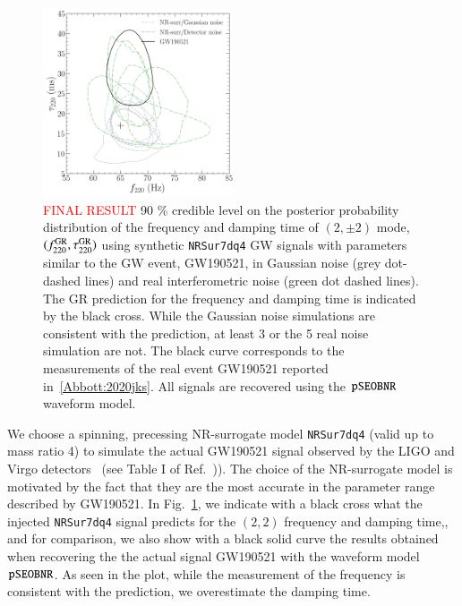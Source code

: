 \begin{figure}
\begin{center}
        \includegraphics[width=0.5\textwidth]{figures/S190521g_swinjs.png}
        \caption{\textcolor{red}{FINAL RESULT} 90 \% credible level on the posterior probability distribution of the frequency and damping time of $(2,\pm 2)$ mode, $(f ^{\text{GR}}_{\text{220}}, \tau ^{\text{GR}}_{\text{220}})$ using synthetic \texttt{NRSur7dq4} GW signals with parameters similar to the GW event, GW190521, in Gaussian noise (grey dot-dashed lines) and real interferometric noise (green dot dashed lines). The GR prediction for the frequency and damping time is indicated by the black cross. While the Gaussian noise simulations are consistent with the prediction, at least 3 or the 5 real noise simulation are not. The black curve corresponds to the measurements of the real event GW190521 reported in~\ref{Abbott:2020jks}. All signals are recovered using the $\texttt{pSEOBNR}$ waveform model.}
        \label{fig:21g_systematics}
\end{center}
\end{figure}

We choose a spinning, precessing NR-surrogate model \texttt{NRSur7dq4} (valid up to mass ratio 4) to simulate the actual GW190521 signal observed by the LIGO and Virgo detectors~\cite{Abbott:2020tfl} (see Table I of Ref.~\cite{Abbott:2020tfl})). The choice of the  NR-surrogate model is motivated by the fact that they are the most accurate in the parameter range described by GW190521. In Fig.~\ref{fig:21g_systematics}, we indicate with a black cross what the injected \texttt{NRSur7dq4} signal predicts for the $(2,2)$ frequency and damping time,, and for comparison, we also show with a black solid curve the results obtained when recovering the the actual signal GW190521 with the waveform model $\texttt{pSEOBNR}$. As seen in the plot, while the measurement of the frequency is consistent with the prediction, we overestimate the damping time.

